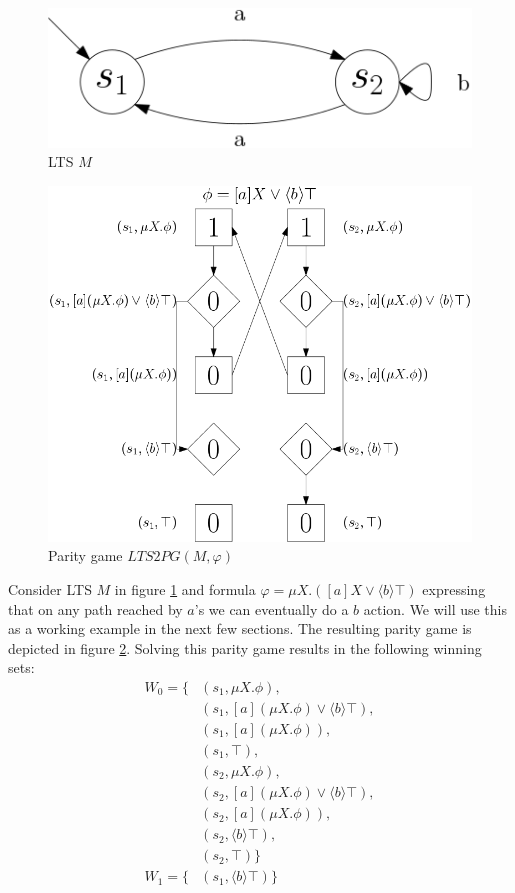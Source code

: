 \begin{figure}[h]
	\centering
	\includegraphics[scale=0.3]{Examples/ExamleVerification/LTSprojempty}
	\caption[LTS $M$]{LTS $M$}
	\label{fig:exverltsprojempty}
\end{figure}\begin{figure}[h]
\centering
\includegraphics[scale=0.3]{Examples/ExamleVerification/PG}
\caption[Parity game $LTS2PG(M, \varphi)$]{Parity game $LTS2PG(M, \varphi)$}
\label{fig:exverpg}
\end{figure}
Consider LTS $M$ in figure \ref{fig:exverltsprojempty} and formula $\varphi = \mu X.([a]X \vee \langle b \rangle \top)$ expressing that on any path reached by $a$'s we can eventually do a $b$ action. We will use this as a working example in the next few sections. The resulting parity game is depicted in figure \ref{fig:exverpg}. Solving this parity game results in the following winning sets:%
\begin{align*}
	W_0 = \{& (s_1, \mu X.\phi),\\
	& (s_1, [a](\mu X. \phi) \vee \langle b \rangle \top),\\
	& (s_1, [a](\mu X. \phi)),\\
	& (s_1, \top),\\
	& (s_2, \mu X.\phi),\\
	& (s_2, [a](\mu X. \phi) \vee \langle b \rangle \top),\\
	& (s_2, [a](\mu X. \phi)),\\
	& (s_2, \langle b \rangle \top),\\
	& (s_2, \top)
	\}\\
	W_1 = \{& (s_1, \langle b \rangle \top )\}
\end{align*}
